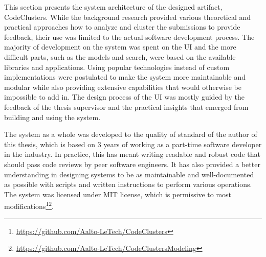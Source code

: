This section presents the system architecture of the designed artifact, CodeClusters. While the background research provided various theoretical and practical approaches how to analyze and cluster the submissions to provide feedback, their use was limited to the actual software development process. The majority of development on the system was spent on the UI and the more difficult parts, such as the models and search, were based on the available libraries and applications. Using popular technologies instead of custom implementations were postulated to make the system more maintainable and modular while also providing extensive capabilities that would otherwise be impossible to add in. The design process of the UI was mostly guided by the feedback of the thesis supervisor and the practical insights that emerged from building and using the system.

The system as a whole was developed to the quality of standard of the author of this thesis, which is based on 3 years of working as a part-time software developer in the industry. In practice, this has meant writing readable and robust code that should pass code reviews by peer software engineers. It has also provided a better understanding in designing systems to be as maintainable and well-documented as possible with scripts and written instructions to perform various operations. The system was licensed under MIT license, which is permissive to most modifications\footnote{\url{https://github.com/Aalto-LeTech/CodeClusters}}\footnote{\url{https://github.com/Aalto-LeTech/CodeClustersModeling}}.


